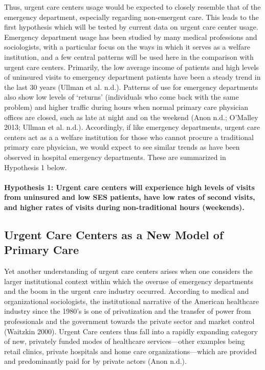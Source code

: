 \documentclass[12pt,twoside]{reedthesis}
\begin{document}
  Thus, urgent care centers usage would be expected to closely resemble
  that of the emergency department, especially regarding non-emergent
  care. This leads to the first hypothesis which will be tested by current
  data on urgent care center usage. Emergency department usage has been
  studied by many medical professions and sociologists, with a particular
  focus on the ways in which it serves as a welfare institution, and a few
  central patterns will be used here in the comparison with urgent care
  centers. Primarily, the low average income of patients and high levels
  of uninsured visits to emergency department patients have been a steady
  trend in the last 30 years (Ullman et al. n.d.). Patterns of use for
  emergency departments also show low levels of `returns' (individuals who
  come back with the same problem) and higher traffic during hours when
  normal primary care physician offices are closed, such as late at night
  and on the weekend (Anon n.d.; O'Malley 2013; Ullman et al. n.d.).
  Accordingly, if like emergency departments, urgent care centers act as a
  a welfare institution for those who cannot procure a traditional primary
  care physician, we would expect to see similar trends as have been
  observed in hospital emergency departments. These are summarized in
  Hypothesis 1 below.
  
  \paragraph{Hypothesis 1: Urgent care centers will experience high levels
  of visits from uninsured and low SES patients, have low rates of second
  visits, and higher rates of visits during non-traditional hours
  (weekends).}\label{hypothesis-1-urgent-care-centers-will-experience-high-levels-of-visits-from-uninsured-and-low-ses-patients-have-low-rates-of-second-visits-and-higher-rates-of-visits-during-non-traditional-hours-weekends.}
  
  \subsection*{Urgent Care Centers as a New Model of Primary
  Care}\label{urgent-care-centers-as-a-new-model-of-primary-care}
  
  Yet another understanding of urgent care centers arises when one
  considers the larger institutional context within which the overuse of
  emergency departments and the boom in the urgent care industry occurred.
  According to medical and organizational sociologists, the institutional
  narrative of the American healthcare industry since the 1980's is one of
  privatization and the transfer of power from professionals and the
  government towards the private sector and market control (Waitzkin
  2000). Urgent Care centers thus fall into a rapidly expanding category
  of new, privately funded modes of healthcare services---other examples
  being retail clinics, private hospitals and home care
  organizations---which are provided and predominantly paid for by private
  actors (Anon n.d.).
  
\end{document}
